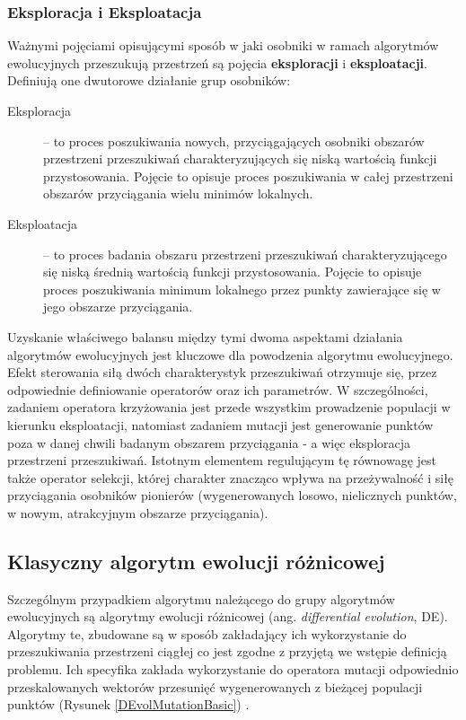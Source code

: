 \documentclass[12pt,a4paper]{report}
\begin{document}
{{\subsubsection{Eksploracja i Eksploatacja}
\par{
Ważnymi pojęciami opisującymi sposób w jaki osobniki w ramach algorytmów ewolucyjnych przeszukują przestrzeń są pojęcia \textbf{eksploracji} i \textbf{eksploatacji}. Definiują one dwutorowe działanie grup osobników:
\begin{description}
  \item[Eksploracja] -- to proces poszukiwania nowych, przyciągających osobniki obszarów przestrzeni przeszukiwań charakteryzujących się niską wartością funkcji przystosowania. Pojęcie to opisuje proces poszukiwania w całej przestrzeni obszarów przyciągania wielu minimów lokalnych. 
  \item[Eksploatacja] -- to proces badania obszaru przestrzeni przeszukiwań charakteryzującego się niską średnią wartością funkcji przystosowania. Pojęcie to opisuje proces poszukiwania minimum lokalnego przez punkty zawierające się w jego obszarze przyciągania.
\end{description}
}
\par{
Uzyskanie właściwego balansu między tymi dwoma aspektami działania algorytmów ewolucyjnych jest kluczowe dla powodzenia algorytmu ewolucyjnego. Efekt sterowania siłą dwóch charakterystyk przeszukiwań otrzymuje się, przez odpowiednie definiowanie operatorów oraz ich parametrów. W szczególności, zadaniem operatora krzyżowania jest przede wszystkim prowadzenie populacji w kierunku eksploatacji, natomiast zadaniem mutacji jest generowanie punktów poza w danej chwili badanym obszarem przyciągania - a więc eksploracja przestrzeni przeszukiwań. Istotnym elementem regulującym tę równowagę jest także operator selekcji, której charakter znacząco wpływa na przeżywalność i siłę przyciągania osobników pionierów (wygenerowanych losowo, nielicznych punktów, w nowym, atrakcyjnym obszarze przyciągania).
}

\subsection{Klasyczny algorytm ewolucji różnicowej}
\label{DEvol_section}
\par{
Szczególnym przypadkiem algorytmu należącego do grupy algorytmów ewolucyjnych są algorytmy ewolucji różnicowej (ang.\emph{ differential evolution}, DE). Algorytmy te, zbudowane są w sposób zakładający ich wykorzystanie do przeszukiwania przestrzeni ciągłej co jest zgodne z przyjętą we wstępie definicją problemu. Ich specyfika zakłada wykorzystanie do operatora mutacji odpowiednio przeskalowanych wektorów przesunięć wygenerowanych z bieżącej populacji punktów (Rysunek \ref{DEvolMutationBasic}) \cite{SpringerIntroToEvol}.
}

}}
\end{document}
